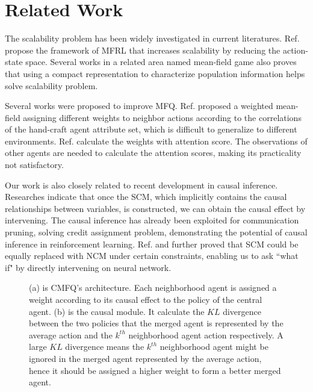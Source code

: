 \section{Related Work}
The scalability problem has been widely investigated in current literatures. Ref. \cite{yang2018mean} propose the framework of MFRL that increases scalability by reducing the action-state space. Several works in a related area named mean-field game also proves that using a compact representation to characterize population information helps solve scalability problem\cite{guo2019learning,Perrin2021-qr}.


Several works were proposed to improve MFQ. Ref. \cite{wu2022weighted} proposed a weighted mean-field assigning different weights to neighbor actions according to the correlations of the hand-craft agent attribute set, which is difficult to generalize to different environments. Ref. \cite{wang2022weighted} calculate the weights with attention score. The observations of other agents are needed to calculate the attention scores, making its practicality not satisfactory. 


Our work is also closely related to recent development in causal inference. Researches indicate that once the SCM, which implicitly contains the causal relationships between variables, is constructed, we can obtain the causal effect by intervening. The causal inference has already been exploited for communication pruning\cite{ding2020learning}, solving credit assignment problem\cite{foerster2018counterfactual,omidshafiei2019learning}, demonstrating the potential of causal inference in reinforcement learning\cite{pearl2019seven,pearl2001direct,peters2017elements}. Ref. \cite{xia2021causal} and \cite{zevcevic2021relating} further proved that SCM could be equally replaced with NCM under certain constraints, enabling us to ask ``what if" by directly intervening on neural network.



\begin{figure}
\setlength{\abovedisplayskip}{1.5pt}
\setlength{\belowdisplayskip}{3pt}
    \centering
    \hspace{0.15in}
    \caption{(a) is CMFQ's architecture. Each neighborhood agent is assigned a weight according to its causal effect to the policy of the central agent. (b) is the causal module. It calculate the $KL$ divergence between the two policies that the merged agent is represented by the average action and the $k^{th}$ neighborhood agent action respectively. A large $KL$ divergence means the $k^{th}$ neighborhood agent might be ignored in the merged agent represented by the average action, hence it should be assigned a higher weight to form a better merged agent.}
    \label{fig:frame&causal_module}
\end{figure}